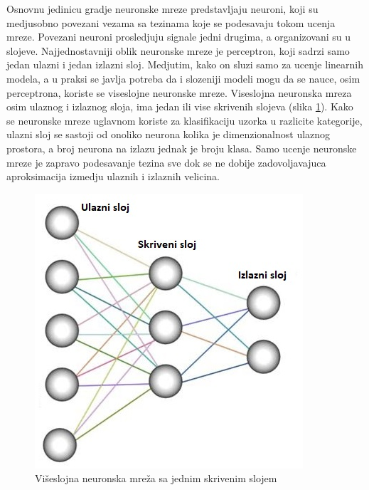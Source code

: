 \documentclass[a4paper]{article}
\begin{document}
Osnovnu jedinicu gradje neuronske mreze predstavljaju neuroni, koji su medjusobno povezani vezama sa tezinama koje se podesavaju tokom ucenja mreze. Povezani neuroni prosledjuju signale jedni drugima, a organizovani su u slojeve. Najjednostavniji oblik neuronske mreze je perceptron, koji sadrzi samo jedan ulazni i jedan izlazni sloj. Medjutim, kako on sluzi samo za ucenje linearnih modela, a u praksi se javlja potreba da i slozeniji modeli mogu da se nauce, osim perceptrona, koriste se viseslojne neuronske mreze. Viseslojna neuronska mreza osim ulaznog i izlaznog sloja, ima jedan ili vise skrivenih slojeva (slika \ref{fig:neural_network_layers}).
Kako se neuronske mreze uglavnom koriste za klasifikaciju uzorka u razlicite kategorije, ulazni sloj se sastoji od onoliko neurona kolika je dimenzionalnost ulaznog prostora, a broj neurona na izlazu jednak je broju klasa. Samo ucenje neuronske mreze je zapravo podesavanje tezina sve dok se ne dobije zadovoljavajuca aproksimacija izmedju ulaznih i izlaznih velicina.

\begin{figure}[h!]
\begin{center}
\includegraphics[scale=1]{neural_network_layers.jpeg}
\end{center}
\caption{Višeslojna neuronska mreža sa jednim skrivenim slojem}
\label{fig:neural_network_layers}
\end{figure}
\end{document}
